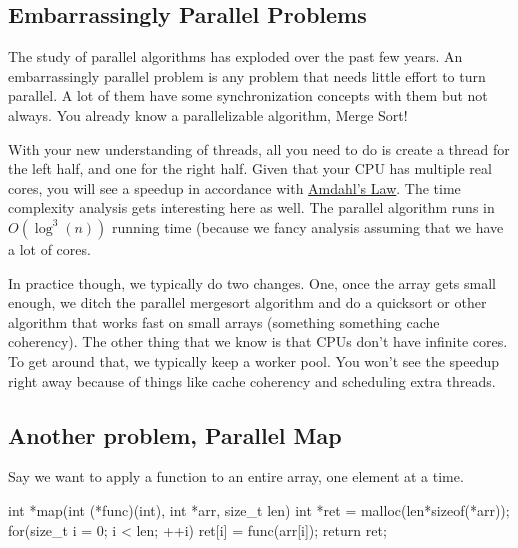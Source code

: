 \begin{aside}

\subsection{Embarrassingly Parallel Problems}\label{embarrassingly-parallel-problems}

The study of parallel algorithms has exploded over the past few years. An embarrassingly parallel problem is any problem that needs little effort to turn parallel. A lot of them have some synchronization concepts with them but not always. You already know a parallelizable algorithm, Merge Sort!

\begin{code}[language=C]
void merge_sort(int *arr, size_t len){
     if(len > 1){
     //Mergesort the left half
     //Mergesort the right half
     //Merge the two halves
     }
\end{code}

With your new understanding of threads, all you need to do is create a thread for the left half, and one for the right half. Given that your CPU has multiple real cores, you will see a speedup in accordance with \href{https://en.wikipedia.org/wiki/Amdahl's_law}{Amdahl's Law}. The time complexity analysis gets interesting here as well. The parallel algorithm runs in $O(\log^3(n))$ running time (because we fancy analysis assuming that we have a lot of cores.

In practice though, we typically do two changes. One, once the array gets small enough, we ditch the parallel mergesort algorithm and do a quicksort or other algorithm that works fast on small arrays (something something cache coherency). The other thing that we know is that CPUs don't have infinite cores. To get around that, we typically keep a worker pool. You won't see the speedup right away because of things like cache coherency and scheduling extra threads.

\subsection{Another problem, Parallel Map}\label{another-problem-parallel-map}

Say we want to apply a function to an entire array, one element at a time.

\begin{code}[language=C]

int *map(int (*func)(int), int *arr, size_t len){
    int *ret = malloc(len*sizeof(*arr));
    for(size_t i = 0; i < len; ++i) 
        ret[i] = func(arr[i]);
    return ret;
}
\end{code}


\end{aside}
